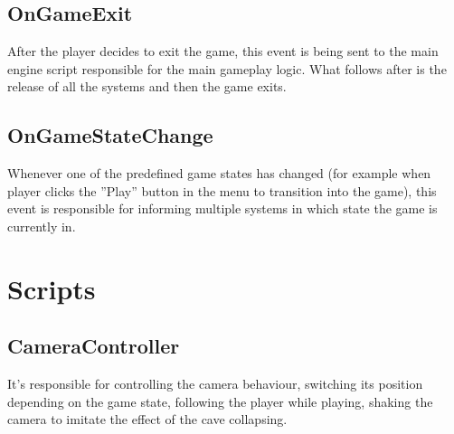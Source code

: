 \documentclass[12pt, english]{article}
\begin{document}
\subsection{OnGameExit}
After the player decides to exit the game, this event is being sent to the main
engine script responsible for the main gameplay logic. What follows after is
the release of all the systems and then the game exits.

\subsection{OnGameStateChange}
Whenever one of the predefined game states has changed (for example when player
clicks the ''Play'' button in the menu to transition into the game), this event
is responsible for informing multiple systems in which state the game is
currently in.

\section{Scripts}

\subsection{CameraController}
It's responsible for controlling the camera behaviour, switching its position
depending on the game state, following the player while playing, shaking the
camera to imitate the effect of the cave collapsing.
\end{document}
